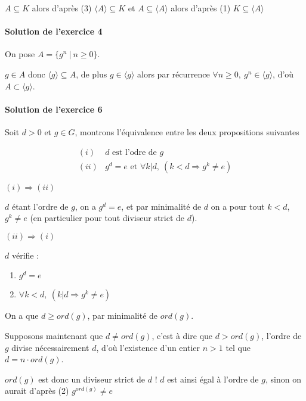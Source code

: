 \documentclass[]{article}
\theoremstyle{remark}
\theoremstyle{definition}
\newenvironment{proofpart}[1]{
	\noindent
	{\textbf{\boldmath #1}}
}{
	\checkmark
}
\begin{document}
$A \subseteq K$ alors d'après (3) $\langle A \rangle \subseteq K$ et $A \subseteq \langle A \rangle$ alors d'après (1) $K \subseteq \langle A \rangle$

\paragraph{Solution de l'exercice 4}
On pose $A = \{g^n ~ | ~ n \geqslant 0\}$.

$g \in A$ donc $\langle g \rangle \subseteq A$, de plus $g \in \langle g \rangle$ alors par récurrence $\forall n \geqslant 0, ~ g^n \in \langle g \rangle$, d'où $A \subset \langle g \rangle$.

\paragraph{Solution de l'exercice 6}

Soit $d > 0$ et $g \in G$, montrons l'équivalence entre les deux propositions suivantes

$$
\begin{array}{ll}
	(i) & d \text{ est l'odre de } g \\
	(ii) & g^d=e \text{ et } \forall k | d, ~ (k < d \Longrightarrow g^k \neq e)
\end{array}
$$

\noindent
\begin{proofpart}{$(i) \Longrightarrow (ii)$}

	$d$ étant l'ordre de $g$, on a $g^d=e$, et par minimalité de $d$ on a pour tout $k < d$, $g^k \neq e$ (en particulier pour tout diviseur strict de $d$).
\end{proofpart}

\begin{proofpart}{$(ii) \Longrightarrow (i)$}

	$d$ vérifie :
	\begin{enumerate}
		\item $g^d=e$
		\item $\forall k < d, ~ (k | d \Longrightarrow g^k \neq e)$
	\end{enumerate}
	
	On a que $d \geqslant ord(g)$, par minimalité de $ord(g)$.
	
	Supposons maintenant que $d \neq ord(g)$, c'est à dire que $d > ord(g)$, l'ordre de $g$ divise nécessairement $d$, d'où l'existence d'un entier $n > 1$ tel que $d= n \cdot ord(g)$.
	
	$ord(g)$ est donc un diviseur strict de $d$ ! $d$ est ainsi égal à l'ordre de $g$, sinon on aurait d'après (2) $g^{ord(g)} \neq e$
\end{proofpart}
\end{document}
